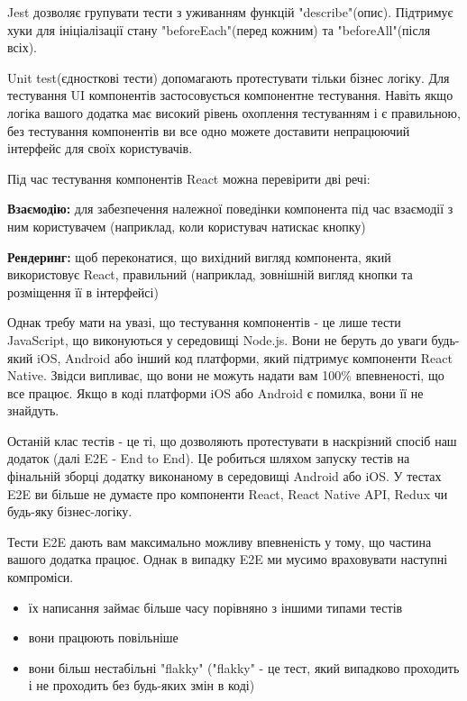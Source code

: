 Jest дозволяє групувати тести з уживанням функцій "describe"(опис).
Підтримує хуки для ініціалізації стану "beforeEach"(перед кожним) та "beforeAll"(після всіх).

Unit test(єдносткові тести) допомагають протестувати тільки бізнес логіку.
Для тестування UI компонентів застосовується компонентне тестування.
Навіть якщо логіка вашого додатка має високий рівень охоплення тестуванням і є правильною,
без тестування компонентів ви все одно можете доставити непрацюючий інтерфейс для своїх користувачів.

Під час тестування компонентів React можна перевірити дві речі:

\begin{itemize}
    \begin{item}
        \textbf{Взаємодію:} для забезпечення належної поведінки компонента під час взаємодії з ним користувачем (наприклад, коли користувач натискає кнопку)
    \end{item}
    \begin{item}
        \textbf{Рендеринг:} щоб переконатися, що вихідний вигляд компонента, який використовує React, правильний (наприклад, зовнішній вигляд кнопки та розміщення її в інтерфейсі)
    \end{item}
\end{itemize}

Однак требу мати на увазі, що тестування компонентів - це лише тести JavaScript, що виконуються у середовищі Node.js.
Вони не беруть до уваги будь-який iOS, Android або інший код платформи, який підтримує компоненти React Native.
Звідси випливає, що вони не можуть надати вам 100\% впевненості, що все працює.
Якщо в коді платформи iOS або Android є помилка, вони її не знайдуть.

Останій клас тестів - це ті, що дозволяють протестувати в наскрізний спосіб наш додаток (далі E2E - End to End).
Це робиться шляхом запуску тестів на фінальній зборці додатку виконаному в середовищі Android або iOS.
У тестах E2E ви більше не думаєте про компоненти React, React Native API, Redux чи будь-яку бізнес-логіку.

Тести E2E дають вам максимально можливу впевненість у тому, що частина вашого додатка працює.
Однак в випадку E2E ми мусимо враховувати наступні компроміси.

\begin{itemize}
    \item їх написання займає більше часу порівняно з іншими типами тестів
    \item вони працюють повільніше
    \item вони більш нестабільні "flakky" ("flakky"  - це тест, який випадково проходить і не проходить без будь-яких змін в коді)
\end{itemize}

